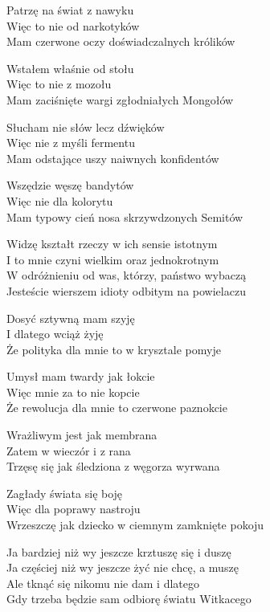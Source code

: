 \begin{text}
    Patrzę na świat z nawyku\\
    Więc to nie od narkotyków\\
    Mam czerwone oczy doświadczalnych królików

    Wstałem właśnie od stołu\\
    Więc to nie z mozołu\\
    Mam zaciśnięte wargi zgłodniałych Mongołów

    Słucham nie słów lecz dźwięków\\
    Więc nie z myśli fermentu\\
    Mam odstające uszy naiwnych konfidentów

    Wszędzie węszę bandytów\\
    Więc nie dla kolorytu\\
    Mam typowy cień nosa skrzywdzonych Semitów

    Widzę kształt rzeczy w ich sensie istotnym\\
    I to mnie czyni wielkim oraz jednokrotnym\\
    W odróżnieniu od was, którzy, państwo wybaczą\\
    Jesteście wierszem idioty odbitym na powielaczu

    Dosyć sztywną mam szyję\\
    I dlatego wciąż żyję\\
    Że polityka dla mnie to w krysztale pomyje

    Umysł mam twardy jak łokcie\\
    Więc mnie za to nie kopcie\\
    Że rewolucja dla mnie to czerwone paznokcie

    Wrażliwym jest jak membrana\\
    Zatem w wieczór i z rana\\
    Trzęsę się jak śledziona z węgorza wyrwana

    Zagłady świata się boję\\
    Więc dla poprawy nastroju\\
    Wrzeszczę jak dziecko w ciemnym zamknięte pokoju

    Ja bardziej niż wy jeszcze krztuszę się i duszę\\
    Ja częściej niż wy jeszcze żyć nie chcę, a muszę\\
    Ale tknąć się nikomu nie dam i dlatego\\
    Gdy trzeba będzie sam odbiorę światu Witkacego
\end{text}
